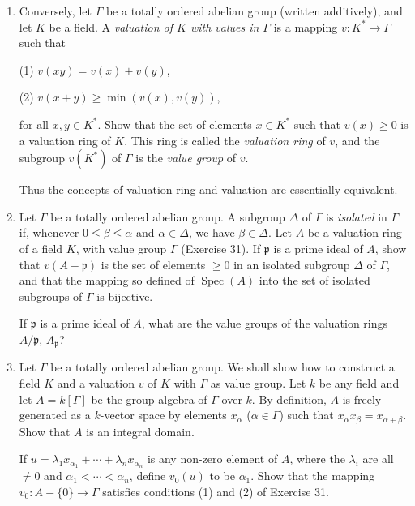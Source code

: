 \begin{enumerate}
Let $v:K^*\longrightarrow\Gamma$ be the canonical homomorphism. Show that $v(x+y)\geq\min(v(x),v(y))$ for all $x,y\in K^*$.

\item Conversely, let $\Gamma$ be a totally ordered abelian group (written additively), and let $K$ be a field. A \textit{valuation of $K$ with values in $\Gamma$} is a mapping $v:K^*\longrightarrow\Gamma$ such that

(1) $v(xy)=v(x)+v(y)$,

(2) $v(x+y)\geq\min(v(x),v(y))$,

for all $x,y\in K^*$. Show that the set of elements $x\in K^*$ such that $v(x)\geq0$ is a valuation ring of $K$. This ring is called the \textit{valuation ring} of $v$, and the subgroup $v(K^*)$ of $\Gamma$ is the \textit{value group} of $v$.

Thus the concepts of valuation ring and valuation are essentially equivalent.

\item Let $\Gamma$ be a totally ordered abelian group. A subgroup $\Delta$ of $\Gamma$ is \textit{isolated} in $\Gamma$ if, whenever $0\leq\beta\leq\alpha$ and $\alpha\in\Delta$, we have $\beta\in\Delta$. Let $A$ be a valuation ring of a field $K$, with value group $\Gamma$ (Exercise 31). If $\mathfrak p$ is a prime ideal of $A$, show that $v(A-\mathfrak p)$ is the set of elements $\geq0$ in an isolated subgroup $\Delta$ of $\Gamma$, and that the mapping so defined of $\operatorname{Spec}(A)$ into the set of isolated subgroups of $\Gamma$ is bijective.

If $\mathfrak p$ is a prime ideal of $A$, what are the value groups of the valuation rings $A/\mathfrak p$, $A_{\mathfrak p}$?

\item Let $\Gamma$ be a totally ordered abelian group. We shall show how to construct a field $K$ and a valuation $v$ of $K$ with $\Gamma$ as value group. Let $k$ be any field and let $A=k[\Gamma]$ be the group algebra of $\Gamma$ over $k$. By definition, $A$ is freely generated as a $k$-vector space by elements $x_\alpha$ ($\alpha\in\Gamma$) such that $x_\alpha x_\beta=x_{\alpha+\beta}$. Show that $A$ is an integral domain.

If $u=\lambda_1x_{\alpha_1}+\cdots+\lambda_nx_{\alpha_n}$ is any non-zero element of $A$, where the $\lambda_i$ are all $\neq0$ and $\alpha_1<\cdots<\alpha_n$, define $v_0(u)$ to be $\alpha_1$. Show that the mapping $v_0:A-\{0\}\longrightarrow\Gamma$ satisfies conditions (1) and (2) of Exercise 31.


\end{enumerate}

